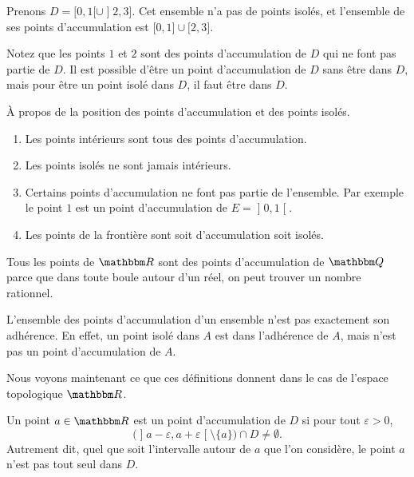 \begin{example}
	Prenons $D=\mathopen[ 0 , 1 [\cup\mathopen] 2 , 3 \mathclose]$. Cet ensemble n'a pas de points isolés, et l'ensemble de ses points d'accumulation est $\mathopen[ 0 , 1 \mathclose]\cup\mathopen[ 2,3  \mathclose]$.

	Notez que les points $1$ et $2$ sont des points d'accumulation de $D$ qui ne font pas partie de $D$. Il est possible d'être un point d'accumulation de $D$ sans être dans $D$, mais pour être un point isolé dans $D$, il faut être dans $D$.
\end{example}

\begin{remark}
    À propos de la position des points d'accumulation et des points isolés.
    \begin{enumerate}
        \item
            Les points intérieurs sont tous des points d'accumulation.
        \item
            Les points isolés ne sont jamais intérieurs.
        \item
            Certains points d'accumulation ne font pas partie de l'ensemble. Par exemple le point $1$ est un point d'accumulation de $E=\mathopen] 0 , 1 \mathclose[$.
        \item
            Les points de la frontière sont soit d'accumulation soit isolés.
    \end{enumerate}
\end{remark}

\begin{example}
	Tous les points de $\eR$ sont des points d'accumulation de $\eQ$ parce que dans toute boule autour d'un réel, on peut trouver un nombre rationnel.
\end{example}

\begin{remark}
	L'ensemble des points d'accumulation d'un ensemble n'est pas exactement son adhérence. En effet, un point isolé dans $A$ est dans l'adhérence de $A$, mais n'est pas un point d'accumulation de $A$.
\end{remark}

Nous voyons maintenant ce que ces définitions donnent dans le cas de l'espace topologique \( \eR\).

\begin{lemma}
    Un point $a\in \eR$ est un point d'accumulation de $D$ si pour tout $\varepsilon>0$,
    \begin{equation}
        \Big( \mathopen] a-\varepsilon , a+\varepsilon \mathclose[\setminus\{ a \} \Big)\cap D\neq\emptyset.
    \end{equation}
    Autrement dit, quel que soit l'intervalle autour de  $a$ que l'on considère, le point $a$ n'est pas tout seul dans $D$.
\end{lemma}

